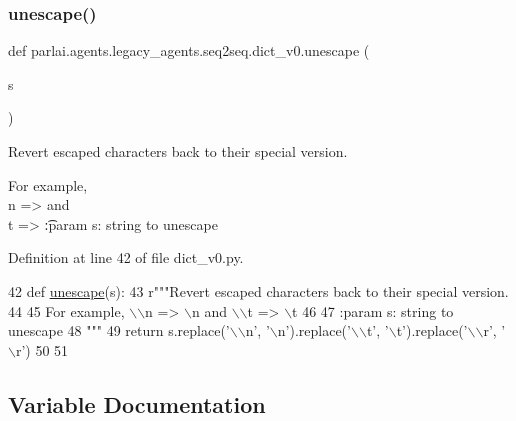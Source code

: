 \subsubsection{\texorpdfstring{unescape()}{unescape()}}
{\footnotesize\ttfamily def parlai.\+agents.\+legacy\+\_\+agents.\+seq2seq.\+dict\+\_\+v0.\+unescape (\begin{DoxyParamCaption}\item[{}]{s }\end{DoxyParamCaption})}

\begin{DoxyVerb}Revert escaped characters back to their special version.

For example, \\n => \n and \\t => \t

:param s: string to unescape
\end{DoxyVerb}
 

Definition at line 42 of file dict\+\_\+v0.\+py.


\begin{DoxyCode}
42 \textcolor{keyword}{def }\hyperlink{namespaceparlai_1_1agents_1_1legacy__agents_1_1seq2seq_1_1dict__v0_a1803c89a6cc7d5323a31a1f7e79728ed}{unescape}(s):
43     \textcolor{stringliteral}{r"""Revert escaped characters back to their special version.}
44 \textcolor{stringliteral}{}
45 \textcolor{stringliteral}{    For example, \(\backslash\)\(\backslash\)n => \(\backslash\)n and \(\backslash\)\(\backslash\)t => \(\backslash\)t}
46 \textcolor{stringliteral}{}
47 \textcolor{stringliteral}{    :param s: string to unescape}
48 \textcolor{stringliteral}{    """}
49     \textcolor{keywordflow}{return} s.replace(\textcolor{stringliteral}{'\(\backslash\)\(\backslash\)n'}, \textcolor{stringliteral}{'\(\backslash\)n'}).replace(\textcolor{stringliteral}{'\(\backslash\)\(\backslash\)t'}, \textcolor{stringliteral}{'\(\backslash\)t'}).replace(\textcolor{stringliteral}{'\(\backslash\)\(\backslash\)r', '}\(\backslash\)r')
50 
51 
\end{DoxyCode}


\subsection{Variable Documentation}
\mbox{\label{namespaceparlai_1_1agents_1_1legacy__agents_1_1seq2seq_1_1dict__v0_a7f1f272d95d31ea5a58f6263ddab8f89}} 
